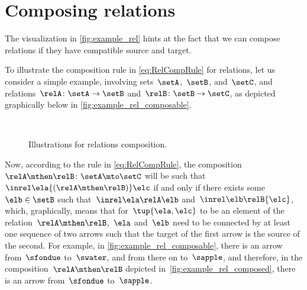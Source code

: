 
\section{Composing relations}


The visualization in \cref{fig:example_rel} hints at the fact that we can compose relations
if they have compatible source and target.

To illustrate the composition rule in \cref{eq:RelCompRule} for relations, let us consider a simple example, involving sets~$\setA$,~$\setB$, and~$\setC$, and relations~$\relA \colon \setA \to \setB$ and~$\relB \colon \setB \to \setC$, as depicted graphically below in \cref{fig:example_rel_composable}.
%
\begin{figure}[h!]
    \centering
    \\

    \caption{Illustrations for relations composition.}
\end{figure}
%
Now, according to the rule in \cref{eq:RelCompRule}, the composition~$\relA \mthen \relB \colon \setA \mto \setC$ will be such that~$\inrel \ela {(\relA \mthen \relB)} \elc$ if and only if there exists some~$\elb \in \setB$ such that~$\inrel \ela \relA \elb $ and~$\inrel \elb \relB{\elc}$, which, graphically, means that for~$\tup{\ela,\elc}$ to be an element of the relation~$\relA \mthen \relB$,~$\ela$ and~$\elb$ need to be connected by at least one sequence of two arrows such that the target of the first arrow is the source of the second.
For example, in \cref{fig:example_rel_composable}, there is an arrow from~$\sfondue$ to~$\swater$, and from there on to~$\sapple$, and therefore, in the composition~$\relA \mthen \relB$ depicted in~\cref{fig:example_rel_composed}, there is an arrow from~$\sfondue$ to~$\sapple$.
